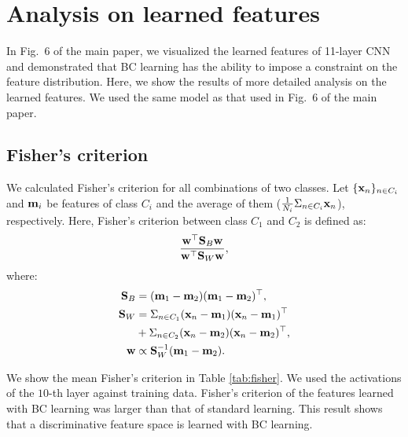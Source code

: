 \documentclass[10pt,twocolumn,letterpaper]{article}
\begin{document}
\newpage{\small


}




\newpage
\appendix

\section{Analysis on learned features}
In Fig.~6 of the main paper, we visualized the learned features of 11-layer CNN and demonstrated that BC learning has the ability to impose a constraint on the feature distribution. Here, we show the results of more detailed analysis on the learned features. We used the same model as that used in Fig.~6 of the main paper.

\subsection{Fisher's criterion}
We calculated Fisher's criterion \cite{fisher1936use} for all combinations of two classes. Let $\{ {\bf x}_n\}_{n \in C_i}$ and ${\bf m}_i$ be features of class $C_i$ and the average of them ($\frac{1}{N_i} \Sigma_{n\in C_i}{{\bf x}_n}$), respectively. Here, Fisher's criterion between class $C_1$ and $C_2$ is defined as:
\begin{equation}
  \frac{{\bf w}^{\top} {\bf S}_B {\bf w}} {{\bf w}^{\top} {\bf S}_W {\bf w}},
  \vspace{-1mm}
\end{equation}
where:
\vspace{-1mm}
\begin{equation}
\begin{split}
  {\bf S}_B &= ({\bf m}_1 - {\bf m}_2)({\bf m}_1 - {\bf m}_2)^{\top}, \\
  {\bf S}_W &= \Sigma_{n \in C_1}{({\bf x}_n - {\bf m}_1)({\bf x}_n - {\bf m}_1)^{\top}} \\
  &+ \Sigma_{n \in C_2}{({\bf x}_n - {\bf m}_2)({\bf x}_n - {\bf m}_2)^{\top}}, \\
  {\bf w} &\propto {\bf S}_W^{-1}({\bf m}_1 - {\bf m}_2).
\end{split}
\vspace{-4mm}
\end{equation}

We show the mean Fisher's criterion in Table \ref{tab:fisher}. We used the activations of the $10$-th layer against training data. Fisher's criterion of the features learned with BC learning was larger than that of standard learning. This result shows that a discriminative feature space is learned with BC learning. 
\end{document}
